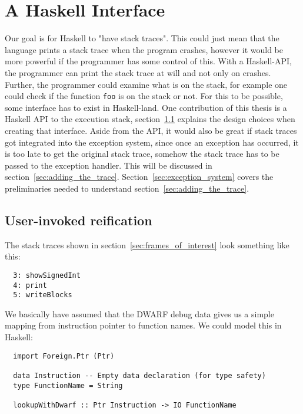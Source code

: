 \chapter{A Haskell Interface} \label{chp:a_haskell_interface}

Our goal is for Haskell to "have stack traces". This could just mean
that the language prints a stack trace when the program crashes, however
it would be more powerful if the programmer has some control of this.
With a Haskell-API, the programmer can print the stack trace at
will and not only on crashes. Further, the programmer could examine
what is on the stack, for example one could check
if the function \texttt{foo} is on the stack or not. For this to be
possible, some interface has to exist in Haskell-land. One contribution
of this thesis is a Haskell API to the execution stack, section~\ref{sec:user-invoked_reification} explains the design choices when
creating that interface. Aside from the API, it would also be great if
stack traces got integrated into the exception system, since once
an exception has occurred, it is too late to get the original stack
trace, somehow the stack trace has to be passed to the exception
handler. This will be discussed
in section~\ref{sec:adding_the_trace}. Section~\ref{sec:exception_system} covers the
preliminaries needed to understand section~\ref{sec:adding_the_trace}.

\section{User-invoked reification} \label{sec:user-invoked_reification}

The stack traces shown in section~\ref{sec:frames_of_interest} look
something like this:

\begin{verbatim}
  3: showSignedInt
  4: print
  5: writeBlocks
\end{verbatim}

We basically have assumed that the DWARF debug data gives us a simple
mapping from instruction pointer to function names. We could model
this in Haskell:

\begin{verbatim}
  import Foreign.Ptr (Ptr)

  data Instruction -- Empty data declaration (for type safety)
  type FunctionName = String

  lookupWithDwarf :: Ptr Instruction -> IO FunctionName
\end{verbatim}

